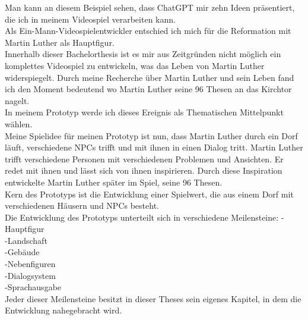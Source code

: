Man kann an diesem Beispiel sehen, dass ChatGPT mir zehn Ideen präsentiert, die ich in meinem Videospiel verarbeiten kann.
\\
Als Ein-Mann-Videospielentwickler entschied ich mich für die Reformation mit Martin Luther als Hauptfigur.
\\
Innerhalb dieser Bachelorthesis ist es mir aus Zeitgründen nicht möglich ein komplettes Videospiel zu entwickeln, was das Leben von Martin Luther widerspiegelt. Durch meine Recherche über Martin Luther und sein Leben fand ich den Moment bedeutend wo Martin Luther seine 96 Thesen an das Kirchtor nagelt.
\\
In meinem Prototyp werde ich dieses Ereignis als Thematischen Mittelpunkt wählen.
\\
Meine Spielidee für meinen Prototyp ist nun, dass Martin Luther durch ein Dorf läuft, verschiedene NPCs trifft und mit ihnen in einen Dialog tritt. Martin Luther trifft verschiedene Personen mit verschiedenen Problemen und Ansichten. Er redet mit ihnen und lässt sich von ihnen inspirieren. Durch diese Inspiration entwickelte Martin Luther später im Spiel, seine 96 Thesen.
\\
Kern des Prototyps ist die Entwicklung einer Spielwert, die aus einem Dorf mit verschiedenen Häusern und NPCs besteht.
\\
Die Entwicklung des Prototyps unterteilt sich in verschiedene Meilensteine:
-Hauptfigur
\\
-Landschaft
\\
-Gebäude
\\
-Nebenfiguren
\\
-Dialogsystem
\\
-Sprachausgabe
\\
Jeder dieser Meilensteine besitzt in dieser Theses sein eigenes Kapitel, in dem die Entwicklung nahegebracht wird.

